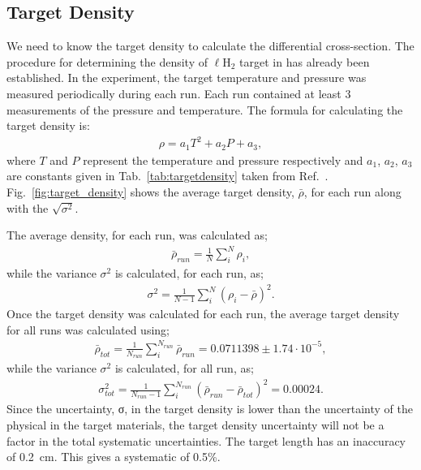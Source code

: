 \subsection{Target Density}\label{sec:analysis.target_density}

We need to know the target density to calculate the differential cross-section. The procedure for determining the density of $\ell$H$_2$ target in  has already been established\cite{clas.target.density}. In the  experiment, the target temperature and pressure was measured periodically during each run. Each run contained at least 3 measurements of the pressure and temperature. The formula for calculating the target density is:
\begin{align}
\rho = a_1 T^2 + a_2 P + a_3,
\label{eq:target_density}
\end{align}
where $T$ and $P$ represent the temperature and pressure respectively and $a_1$, $a_2$, $a_3$ are constants given in Tab.~\ref{tab:targetdensity} taken from Ref.~\cite{clas.target.density}. Fig.~\ref{fig:target_density} shows the average target density, $\bar \rho$, for each run along with the $\sqrt{\sigma^2}$.

The average density, for each run, was calculated as;
\begin{align}
\bar \rho_{run} = \frac{1}{N}\sum_i^N \rho_i,
\end{align}
while the variance $\sigma^2$ is calculated, for each run, as;
\begin{align}
\sigma^2 = \frac{1}{N - 1}\sum_i^N (\rho_i - \bar \rho)^2.
\end{align}
Once the target density was calculated for each run, the average target density for all  runs was calculated using;
\begin{align}
\bar \rho_{tot} = \frac{1}{N_{run}}\sum_i^{N_{run}} \bar \rho_{run} = 0.0711398 \pm 1.74 \cdot10^{-5},
\end{align}
while the variance $\sigma^2$ is calculated, for all  run, as;
\begin{align}
\sigma_{tot}^2 = \frac{1}{N_{run} -1}\sum_i^{N_{run}} (\bar \rho_{run} - \bar \rho_{tot})^2 = 0.00024.
\end{align}
Since the uncertainty, σ, in the target density is lower than the uncertainty of the physical in the target materials, the target density uncertainty will not be a factor in the total systematic uncertainties. The target length has an inaccuracy of 0.2~cm. This gives a systematic of 0.5\%.

